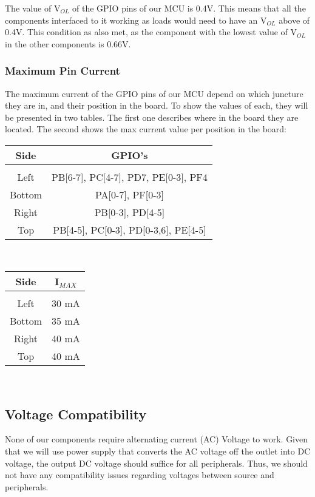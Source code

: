 			The value of V$_{OL}$ of the GPIO pins of our MCU is 0.4V. This means that all the components interfaced to it working as loads would need to have an V$_{OL}$ above of 0.4V. This condition as also met, as the component with the lowest value of V$_{OL}$ in the other components is 0.66V.

		\subsubsection{Maximum Pin Current}

			The maximum current of the GPIO pins of our MCU depend on which juncture they are in, and their position in the board. To show the values of each, they will be presented in two tables. The first one describes where in the board they are located. The second shows the max current value per position in the board: \\

			\begin{tabular}{|c|c|}
			\hline
			 Side & GPIO's \\
			\hline
			&    \\
			Left & PB[6-7], PC[4-7], PD7, PE[0-3], PF4 \\
			Bottom & PA[0-7], PF[0-3] \\
			Right & PB[0-3], PD[4-5] \\
			Top & PB[4-5], PC[0-3], PD[0-3,6], PE[4-5] \\

			\hline
			\end{tabular} \\ 

			\begin{tabular}{|c|c|}
			\hline
			 Side & I$_{MAX}$ \\
			\hline
			&    \\
			Left & 30 mA \\
			Bottom & 35 mA \\
			Right & 40 mA \\
			Top & 40 mA \\

			\hline
			\end{tabular} \\ 	 

	\subsection{Voltage Compatibility}

		None of our components require alternating current (AC) Voltage to work. Given that we will use power supply that converts the AC voltage off the outlet into DC voltage, the output DC voltage should suffice for all peripherals. Thus, we should not have any compatibility issues regarding voltages between source and peripherals. 

